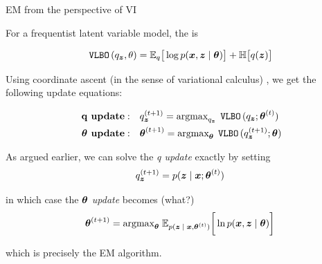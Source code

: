 \documentclass[10pt]{beamer}
\begin{document}
\begin{frame}{EM from the perspective of VI}

 
 
For a frequentist latent variable model, the \VLBO is 

\begin{equation*} 
\VLBO(q_\+z, \theta) = \E_q \big[ \log p(\+x, \+z \cond \+\theta) \big]  +  \mathbb{H} \big[q(\+z) \big]  %
\end{equation*}


\pause 

Using coordinate ascent \tiny (in the sense of variational calculus) \normalsize ,  we get the following update equations: 

\begin{align}
\textbf{q update}: \quad & q_{{\boldsymbol z}}^{(t+1)} = \text{argmax}_{q_{{\boldsymbol z}}} \; \,\texttt{VLBO}\, (q_{{\boldsymbol z}} ; {\boldsymbol \theta}^{(t)} ) \label{q_update} \\
\textbf{ ${\boldsymbol \theta}$ update}: \quad & {\boldsymbol \theta}^{(t+1)} = \text{argmax}_{{\boldsymbol \theta}} \; \,\texttt{VLBO}\, (q_{{\boldsymbol z}}^{(t+1)} ; {\boldsymbol \theta} )\label{theta_update} 
\end{align} 

\pause
 
As argued earlier, we can solve the \textit{q update} exactly by setting   
\[ q_{{\boldsymbol z}}^{(t+1)} =   p({\boldsymbol z} \; | \; {\boldsymbol x}; {\boldsymbol \theta}^{(t)})\]  
 
in which case the \textit{ ${\boldsymbol \theta}$ update} becomes  \tiny (what?) \normalsize \pause 
\begin{equation}
 {\boldsymbol \theta}^{(t+1)} =  \text{argmax}_{{\boldsymbol \theta}} \; \mathbb{E}_{p({\boldsymbol z} \; | \; {\boldsymbol x} , {\boldsymbol \theta}^{(t)})} \bigg[ \ln p({\boldsymbol x}, {\boldsymbol z} \; | \; {\boldsymbol \theta}) \bigg] \label{EM}
\end{equation}
 
which is precisely the EM algorithm. 


\end{frame}
\end{document}
